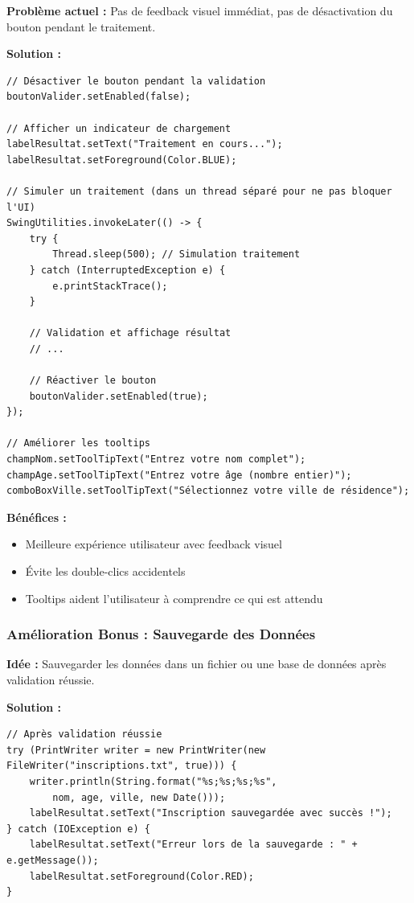 \documentclass[11pt,a4paper]{article}
\begin{document}
\begin{correctionbox}
\textbf{Problème actuel :} Pas de feedback visuel immédiat, pas de désactivation du bouton pendant le traitement.

\textbf{Solution :}
\begin{lstlisting}
// Désactiver le bouton pendant la validation
boutonValider.setEnabled(false);

// Afficher un indicateur de chargement
labelResultat.setText("Traitement en cours...");
labelResultat.setForeground(Color.BLUE);

// Simuler un traitement (dans un thread séparé pour ne pas bloquer l'UI)
SwingUtilities.invokeLater(() -> {
    try {
        Thread.sleep(500); // Simulation traitement
    } catch (InterruptedException e) {
        e.printStackTrace();
    }
    
    // Validation et affichage résultat
    // ...
    
    // Réactiver le bouton
    boutonValider.setEnabled(true);
});

// Améliorer les tooltips
champNom.setToolTipText("Entrez votre nom complet");
champAge.setToolTipText("Entrez votre âge (nombre entier)");
comboBoxVille.setToolTipText("Sélectionnez votre ville de résidence");
\end{lstlisting}

\textbf{Bénéfices :}
\begin{itemize}
    \item Meilleure expérience utilisateur avec feedback visuel
    \item Évite les double-clics accidentels
    \item Tooltips aident l'utilisateur à comprendre ce qui est attendu
\end{itemize}

\subsubsection{Amélioration Bonus : Sauvegarde des Données}

\textbf{Idée :} Sauvegarder les données dans un fichier ou une base de données après validation réussie.

\textbf{Solution :}
\begin{lstlisting}
// Après validation réussie
try (PrintWriter writer = new PrintWriter(new FileWriter("inscriptions.txt", true))) {
    writer.println(String.format("%s;%s;%s;%s", 
        nom, age, ville, new Date()));
    labelResultat.setText("Inscription sauvegardée avec succès !");
} catch (IOException e) {
    labelResultat.setText("Erreur lors de la sauvegarde : " + e.getMessage());
    labelResultat.setForeground(Color.RED);
}
\end{lstlisting}
\end{correctionbox}
\end{document}
